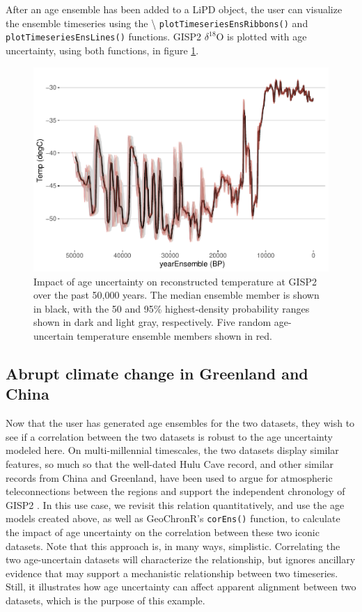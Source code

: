 \documentclass[gchron, manuscript]{copernicus}
\begin{document}
After an age ensemble has been added to a LiPD object, the user can visualize the ensemble timeseries using the \textbackslash{} \texttt{plotTimeseriesEnsRibbons()} and \texttt{plotTimeseriesEnsLines()} functions.
GISP2 \(\delta^{18}\)O is plotted with age uncertainty, using both functions, in figure \ref{fig:timeseries}.

\begin{figure}
\includegraphics[width=12cm]{geoChronR-paper_files/figure-latex/timeseries-1} \caption{Impact of age uncertainty on reconstructed temperature at GISP2 over the past 50,000 years. The median ensemble member is shown in black, with the 50 and 95\% highest-density probability ranges shown in dark and light gray, respectively. Five random age-uncertain temperature ensemble members shown in red.}\label{fig:timeseries}
\end{figure}

\subsection{Abrupt climate change in Greenland and China}

Now that the user has generated age ensembles for the two datasets, they wish to see if a correlation between the two datasets is robust to the age uncertainty modeled here.
On multi-millennial timescales, the two datasets display similar features, so much so that the well-dated Hulu Cave record, and other similar records from China and Greenland, have been used to argue for atmospheric teleconnections between the regions and support the independent chronology of GISP2 \citep{hulu2001}.
In this use case, we revisit this relation quantitatively, and use the age models created above, as well as GeoChronR's \texttt{corEns()} function, to calculate the impact of age uncertainty on the correlation between these two iconic datasets.
Note that this approach is, in many ways, simplistic.
Correlating the two age-uncertain datasets will characterize the relationship, but ignores ancillary evidence that may support a mechanistic relationship between two timeseries. Still, it illustrates how age uncertainty can affect apparent alignment between two datasets, which is the purpose of this example.
\end{document}
